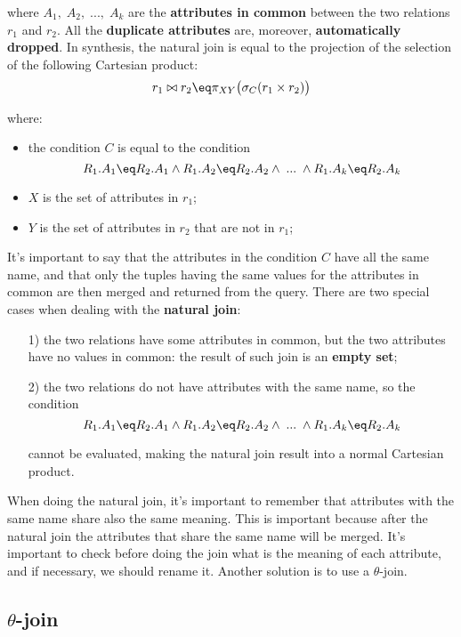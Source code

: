 where $A_1, \; A_2, \; ..., \; A_k$ are the \textbf{attributes in common} between the two relations $r_1$ and $r_2$. All the \textbf{duplicate attributes} are, moreover, \textbf{automatically dropped}. In synthesis, the natural join is equal to the projection of the selection of the following Cartesian product:
\[ r_1 \bowtie r_2 \eq \pi_{XY}\big( \sigma_C(r_1 \times r_2) \big) \]

where:
\begin{itemize}
    \item the condition $C$ is equal to the condition
    \[ R_1.A_1 \eq R_2.A_1 \wedge R_1.A_2 \eq R_2.A_2 \wedge \; ... \; \wedge R_1.A_k \eq R_2.A_k \]
    \item $X$ is the set of attributes in $r_1$;
    \item $Y$ is the set of attributes in $r_2$ that are not in $r_1$;
\end{itemize}

It's important to say that the attributes in the condition $C$ have all the same name, and that only the tuples having the same values for the attributes in common are then merged and returned from the query.
\nwl
There are two special cases when dealing with the \textbf{natural join}:
\begin{itemize}
    \item [1)] the two relations have some attributes in common, but the two attributes have no values in common: the result of such join is an \textbf{empty set};
    \item [2)] the two relations do not have attributes with the same name, so the condition
    \[ R_1.A_1 \eq R_2.A_1 \wedge R_1.A_2 \eq R_2.A_2 \wedge \; ... \; \wedge R_1.A_k \eq R_2.A_k \]

    cannot be evaluated, making the natural join result into a normal Cartesian product.
\end{itemize}

When doing the natural join, it's important to remember that attributes with the same name share also the same meaning. This is important because after the natural join the attributes that share the same name will be merged. It's important to check before doing the join what is the meaning of each attribute, and if necessary, we should rename it. Another solution is to use a $\theta$-join.

\subsection{$\theta$-join}


